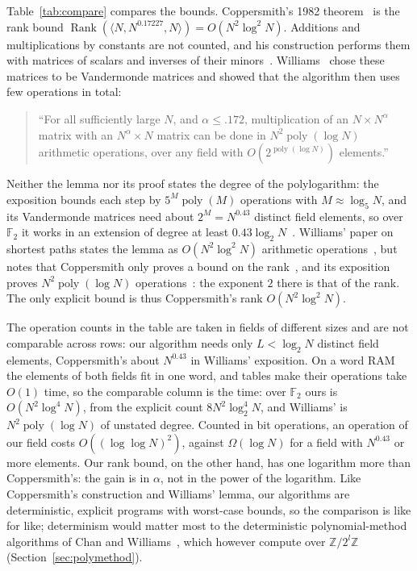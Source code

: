 \documentclass[11pt]{article}
\theoremstyle{definition}
\theoremstyle{remark}
\newcommand{\Z}{\mathbb{Z}}
\newcommand{\F}{\mathbb{F}}
\newcommand{\Rank}{\operatorname{Rank}}
\DeclareMathOperator{\poly}{poly}
\begin{document}
Table~\ref{tab:compare} compares the bounds. Coppersmith's 1982 theorem~\cite[p.~467]{Cop82} is the rank bound $\Rank(\langle N,N^{0.17227},N\rangle)=O(N^2\log^2N)$. Additions and multiplications by constants are not counted, and his construction performs them with matrices of scalars and inverses of their minors~\cite[p.~468]{Cop82}. Williams~\cite[Lemma~2.3 and Appendix~A]{Wil14b} chose these matrices to be Vandermonde matrices and showed that the algorithm then uses few operations in total:
\begin{quote}
``For all sufficiently large $N$, and $\alpha\le.172$, multiplication of an $N\times N^\alpha$ matrix with an $N^\alpha\times N$ matrix can be done in $N^2\poly(\log N)$ arithmetic operations, over any field with $O(2^{\poly(\log N)})$ elements.''
\end{quote}
Neither the lemma nor its proof states the degree of the polylogarithm: the exposition bounds each step by $5^M\poly(M)$ operations with $M\approx\log_5N$, and its Vandermonde matrices need about $2^M=N^{0.43}$ distinct field elements, so over $\F_2$ it works in an extension of degree at least $0.43\log_2N$~\cite[Appendix~A]{Wil14b}. Williams' paper on shortest paths states the lemma as $O(N^2\log^2N)$ arithmetic operations~\cite[Lemma~2.3]{Wil14a}, but notes that Coppersmith only proves a bound on the rank~\cite[footnote~5]{Wil14a}, and its exposition proves $N^2\poly(\log N)$ operations~\cite[Lemma~C.1]{Wil14a}: the exponent $2$ there is that of the rank. The only explicit bound is thus Coppersmith's rank $O(N^2\log^2N)$.

The operation counts in the table are taken in fields of different sizes and are not comparable across rows: our algorithm needs only $L<\log_2N$ distinct field elements, Coppersmith's about $N^{0.43}$ in Williams' exposition. On a word RAM the elements of both fields fit in one word, and tables make their operations take $O(1)$ time, so the comparable column is the time: over $\F_2$ ours is $O(N^2\log^4N)$, from the explicit count $8N^2\log_2^4N$, and Williams' is $N^2\poly(\log N)$ of unstated degree. Counted in bit operations, an operation of our field costs $O((\log\log N)^2)$, against $\Omega(\log N)$ for a field with $N^{0.43}$ or more elements. Our rank bound, on the other hand, has one logarithm more than Coppersmith's: the gain is in $\alpha$, not in the power of the logarithm. Like Coppersmith's construction and Williams' lemma, our algorithms are deterministic, explicit programs with worst-case bounds, so the comparison is like for like; determinism would matter most to the deterministic polynomial-method algorithms of Chan and Williams~\cite{CW16}, which however compute over $\Z/2^l\Z$ (Section~\ref{sec:polymethod}).
\end{document}
